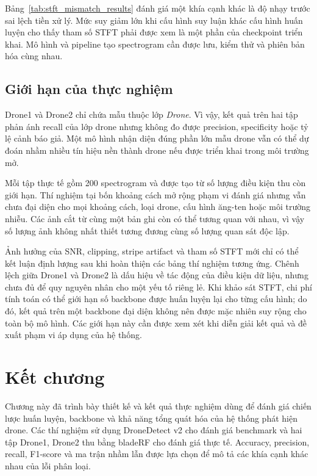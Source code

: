 \documentclass[../DoAn.tex]{subfiles}
\begin{document}
Bảng~\ref{tab:stft_mismatch_results} đánh giá một khía cạnh khác là độ nhạy trước sai lệch tiền xử lý. Mức suy giảm lớn khi cấu hình suy luận khác cấu hình huấn luyện cho thấy tham số STFT phải được xem là một phần của checkpoint triển khai. Mô hình và pipeline tạo spectrogram cần được lưu, kiểm thử và phiên bản hóa cùng nhau.

\subsection{Giới hạn của thực nghiệm}

Drone1 và Drone2 chỉ chứa mẫu thuộc lớp \textit{Drone}. Vì vậy, kết quả trên hai tập phản ánh recall của lớp drone nhưng không đo được precision, specificity hoặc tỷ lệ cảnh báo giả. Một mô hình nhận diện đúng phần lớn mẫu drone vẫn có thể dự đoán nhầm nhiều tín hiệu nền thành drone nếu được triển khai trong môi trường mở.

Mỗi tập thực tế gồm 200 spectrogram và được tạo từ số lượng điều kiện thu còn giới hạn. Thí nghiệm tại bốn khoảng cách mở rộng phạm vi đánh giá nhưng vẫn chưa đại diện cho mọi khoảng cách, loại drone, cấu hình ăng-ten hoặc môi trường nhiễu. Các ảnh cắt từ cùng một bản ghi còn có thể tương quan với nhau, vì vậy số lượng ảnh không nhất thiết tương đương cùng số lượng quan sát độc lập.

Ảnh hưởng của SNR, clipping, stripe artifact và tham số STFT mới chỉ có thể kết luận định lượng sau khi hoàn thiện các bảng thí nghiệm tương ứng. Chênh lệch giữa Drone1 và Drone2 là dấu hiệu về tác động của điều kiện dữ liệu, nhưng chưa đủ để quy nguyên nhân cho một yếu tố riêng lẻ. Khi khảo sát STFT, chi phí tính toán có thể giới hạn số backbone được huấn luyện lại cho từng cấu hình; do đó, kết quả trên một backbone đại diện không nên được mặc nhiên suy rộng cho toàn bộ mô hình. Các giới hạn này cần được xem xét khi diễn giải kết quả và đề xuất phạm vi áp dụng của hệ thống.

\section{Kết chương}

Chương này đã trình bày thiết kế và kết quả thực nghiệm dùng để đánh giá chiến lược huấn luyện, backbone và khả năng tổng quát hóa của hệ thống phát hiện drone. Các thí nghiệm sử dụng DroneDetect v2 cho đánh giá benchmark và hai tập Drone1, Drone2 thu bằng bladeRF cho đánh giá thực tế. Accuracy, precision, recall, F1-score và ma trận nhầm lẫn được lựa chọn để mô tả các khía cạnh khác nhau của lỗi phân loại.
\end{document}
